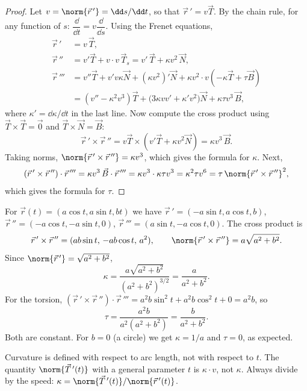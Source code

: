 \begin{proof}
Let $v=\norm{\vec r\,'}=\dd s/\dd t$, so that $\vec r\,'=v\vec T$. By the chain rule, for any function of $s$: $\dfrac{\dd}{\dd t}=v\dfrac{\dd}{\dd s}$. Using the Frenet equations,
\begin{align*}
\vec r\,'&=v\,\vec T,\\
\vec r\,''&=v'\vec T+v\cdot v\,\vec T_s=v'\,\vec T+\kappa v^2\,\vec N,\\
\vec r\,'''&=v''\vec T+v'v\kappa\vec N+(\kappa v^2)'\vec N+\kappa v^2\cdot v(-\kappa\vec T+\tau\vec B)\\
&=(v''-\kappa^2v^3)\vec T+\bigl(3\kappa vv'+\kappa'v^2\bigr)\vec N+\kappa\tau v^3\,\vec B,
\end{align*}
where $\kappa'=\dd\kappa/\dd t$ in the last line. Now compute the cross product using $\vec T\times\vec T=\vec 0$ and $\vec T\times\vec N=\vec B$:
\[
\vec r\,'\times\vec r\,''=v\vec T\times(v'\vec T+\kappa v^2\vec N)=\kappa v^3\,\vec B .
\]
Taking norms, $\norm{\vec r\,'\times\vec r\,''}=\kappa v^3$, which gives the formula for $\kappa$. Next,
\[
(\vec r\,'\times\vec r\,'')\cdot\vec r\,'''=\kappa v^3\,\vec B\cdot\vec r\,'''=\kappa v^3\cdot\kappa\tau v^3=\kappa^2\tau v^6=\tau\,\norm{\vec r\,'\times\vec r\,''}^2,
\]
which gives the formula for $\tau$.
\end{proof}

\begin{example}
For $\vec r(t)=(a\cos t,a\sin t,bt)$ we have $\vec r\,'=(-a\sin t,a\cos t,b)$, $\vec r\,''=(-a\cos t,-a\sin t,0)$, $\vec r\,'''=(a\sin t,-a\cos t,0)$. The cross product is
\[
\vec r\,'\times\vec r\,''=(ab\sin t,\,-ab\cos t,\,a^2),\qquad \norm{\vec r\,'\times\vec r\,''}=a\sqrt{a^2+b^2}.
\]
Since $\norm{\vec r\,'}=\sqrt{a^2+b^2}$,
\[
\kappa=\frac{a\sqrt{a^2+b^2}}{(a^2+b^2)^{3/2}}=\frac{a}{a^2+b^2}.
\]
For the torsion, $(\vec r\,'\times\vec r\,'')\cdot\vec r\,'''=a^2b\sin^2t+a^2b\cos^2t+0=a^2b$, so
\[
\tau=\frac{a^2b}{a^2(a^2+b^2)}=\frac{b}{a^2+b^2}.
\]
Both are constant. For $b=0$ (a circle) we get $\kappa=1/a$ and $\tau=0$, as expected.
\end{example}

\begin{pitfall}
Curvature is defined with respect to arc length, not with respect to $t$. The quantity $\norm{\vec T\,'(t)}$ with a general parameter $t$ is $\kappa\cdot v$, not $\kappa$. Always divide by the speed: $\kappa=\norm{\vec T\,'(t)}/\norm{\vec r\,'(t)}$.
\end{pitfall}

